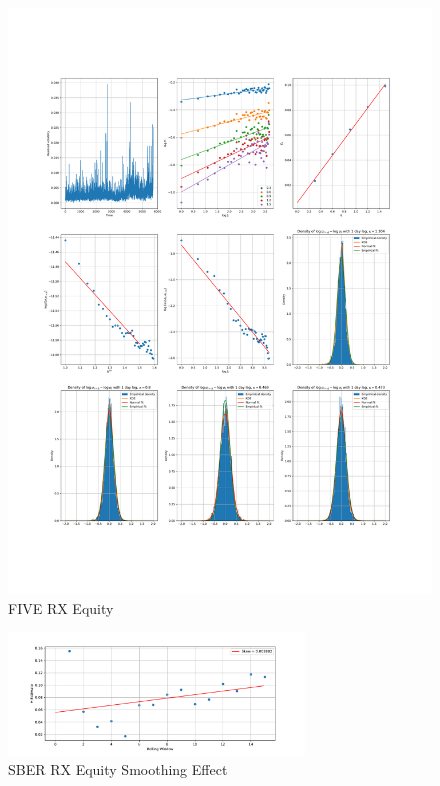     \begin{figure}[h]
        \centering
        \includegraphics[width=\textwidth]{fig/FIVE RX Equity.pdf}
        \caption{FIVE RX Equity}
    \end{figure}



    \begin{figure}[h]
        \centering
        \includegraphics[width=0.7\textwidth]{fig/SBER RX Equity Smoothing Effect.pdf}
        \caption{SBER RX Equity Smoothing Effect}
    \end{figure}

